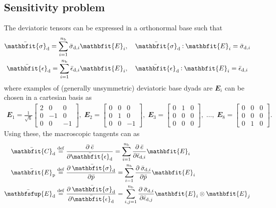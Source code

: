 \documentclass[12pt,a4paper]{article}
\renewcommand{\ts}[1]{\mathbfit{#1}}
\renewcommand{\tf}[1]{\mathbfsfup{#1}}
\renewcommand{\dev}{\mathrm{d}}
\newcommand{\ded}{\mathrm{d}}
\newcommand{\dep}{\mathrm{p}}
\begin{document}
\subsection{Sensitivity problem}
\label{appendix:sensitivity}

The deviatoric tensors can be expressed in a orthonormal base such that
\begin{subequations}
\begin{gather}
 \bar{\ts\sigma}_\dev = \sum_{i=1}^{n_{\mathrm{b}}} \bar{\sigma}_{\dev,i} \ts E_i,\quad \bar{\ts\sigma}_\dev \dprod \ts E_i = \bar{\sigma}_{\dev,i}
\label{eq:sigma_base} \\
 \bar{\ts\epsilon}_\dev = \sum_{i=1}^{n_{\mathrm{b}}} \bar{\epsilon}_{\dev,i} \ts E_i,\quad \bar{\ts\epsilon}_\dev \dprod \ts E_i = \bar{\epsilon}_{\dev,i}
\label{eq:d_base}
\end{gather}
\end{subequations}
where examples of (generally unsymmetric) deviatoric base dyads are $\ts E_i$ can be chosen in a cartesian basis as
\begin{equation}
\begin{gathered}
 \ts E_1 = \frac{1}{\sqrt{6}}\left[\begin{smallmatrix} 2 & 0 & 0\\ 0 & -1 & 0\\ 0 & 0 & -1\end{smallmatrix}\right],\;
 \ts E_2 = \left[\begin{smallmatrix} 0 & 0 & 0\\ 0 & 1 & 0 \\ 0 & 0 & -1\end{smallmatrix}\right],\;
 \ts E_3 = \left[\begin{smallmatrix} 0 & 1 & 0\\ 0 & 0 & 0 \\ 0 & 0 & 0\end{smallmatrix}\right],\;
 \ldots,\;
 \ts E_8 = \left[\begin{smallmatrix} 0 & 0 & 0\\ 0 & 0 & 0 \\ 0 & 1 & 0\end{smallmatrix}\right].
\end{gathered}
\end{equation}
Using these, the macroscopic tangents can as
\begin{align}
 \bar{\ts C}_\ded \defeq \;&\pd{\bar{e}}{\bar{\ts\epsilon}_\dev} = \sum_{i=1}^{n_\mathrm{b}} \pd{\bar{e}}{\bar{\epsilon}_{\dev,i}} \ts E_i\\
 \bar{\ts E}_\dep \defeq \;&\pd{\bar{\ts\sigma}_\dev}{\bar{p}} = \sum_{i=1}^{n_\mathrm{b}} \pd{\bar{\sigma}_{\dev,i}}{\bar{p}} \ts E_i\\
 \bar{\tf E}_\ded \defeq \;&\pd{\bar{\ts\sigma}_\dev}{\bar{\ts\epsilon}_\dev} =  \sum_{i,j=1}^{n_\mathrm{b}} \pd{\bar{\sigma}_{\dev,i}}{\bar{\epsilon}_{\dev,j}} \ts E_i \outerp \ts E_j
\end{align}
\end{document}
